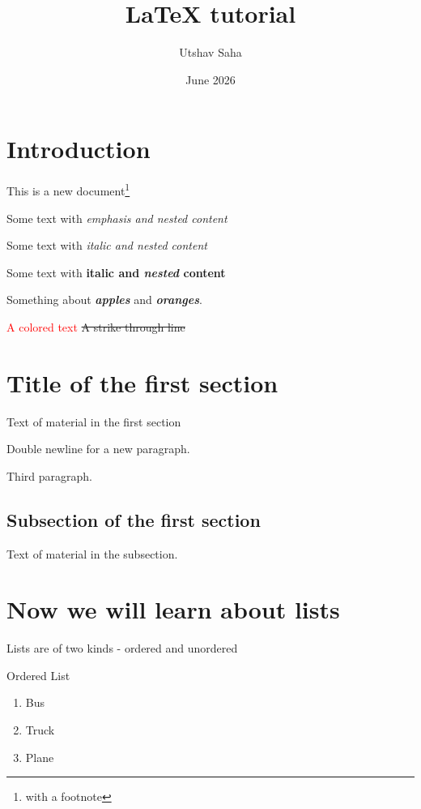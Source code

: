 \documentclass{article}
\title{\textbf{\LaTeX} tutorial}
\author{Utshav Saha}
\date{June 2026}
\newcommand\kw[1]{\textbf{\itshape #1}}
\begin{document}
\maketitle %

\tableofcontents

\newpage
\section{Introduction}
This is a
new document\footnote{with a footnote}

Some text with \emph{emphasis and \emph{nested} content}

Some text with \textit{italic and \textit{nested} content}

Some text with \textbf{italic and \textit{nested} content}

Something about \kw{apples} and \kw{oranges}.

\textcolor{red}{A colored text}
\sout{A strike through line}


\section{Title of the first section}

Text of material in the first section

Double newline for a new paragraph.

Third paragraph.


\subsection{Subsection of the first section}

Text of material in the subsection.

\section{Now we will learn about lists}

Lists are of two kinds - ordered and unordered
\vspace{2\baselineskip}


Ordered List
\begin{enumerate}
    \item Bus 
    \item Truck
    \item Plane
\end{enumerate}
\vspace{2\baselineskip}
\end{document}

